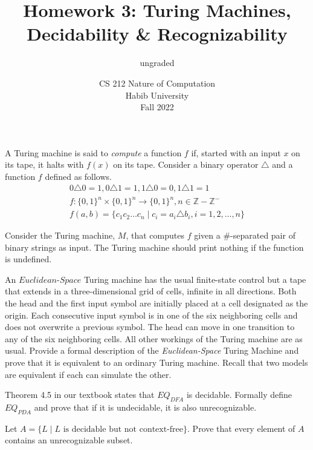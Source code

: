 \documentclass[addpoints]{exam}
\title{Homework 3: Turing Machines, Decidability \& Recognizability}
\author{ungraded} %
\date{CS 212 Nature of Computation\\Habib University\\Fall 2022}
\begin{document}
\maketitle

\begin{questions}

\question \label{q:lang} A Turing machine is said to \textit{compute} a function $f$ if, started with an input $x$ on its tape, it halts with $f(x)$ on its tape. Consider a binary operator $\triangle$ and a function $f$ defined as follows.
  \begin{align*}
    0\triangle 0=1, 0\triangle 1=1, 1\triangle 0=0,1\triangle 1=1\\
    f:\{0,1\}^n\times \{0,1\}^n\to \{0,1\}^n, n\in \mathbb{Z}-\mathbb{Z}^-    \\
    f(a,b) = \{ c_1c_2\ldots c_n \mid c_i = a_i\triangle b_i, i = 1,2,\ldots,n\}
  \end{align*}

Consider the Turing machine, $M$, that computes $f$ given a $\#$-separated pair of binary strings as input. The Turing machine should print nothing if the function is undefined.


\question [10] An $\textit{Euclidean-Space}$ Turing machine has the usual finite-state control but a tape that extends in a three-dimensional grid of cells, infinite in all directions. Both the head and the first input symbol are initially placed at a cell designated as the origin. Each consecutive input symbol is in one of the six neighboring cells and does not overwrite a previous symbol. The head can move in one transition to any of the six neighboring cells. All other workings of the Turing machine are as usual. Provide a formal description of the \textit{Euclidean-Space} Turing Machine and prove that it is equivalent to an ordinary Turing machine. Recall that two models are equivalent if each can simulate the other.

\question [10] Theorem 4.5 in our textbook states that $EQ_{DFA}$ is decidable. Formally define $EQ_{PDA}$ and prove that if it is undecidable, it is also unrecognizable. 

  
\question [10] Let $A = \{L \mid L\text{ is decidable but not context-free}\}$. Prove that every element of $A$ contains an unrecognizable subset.


\end{questions}
\end{document}
